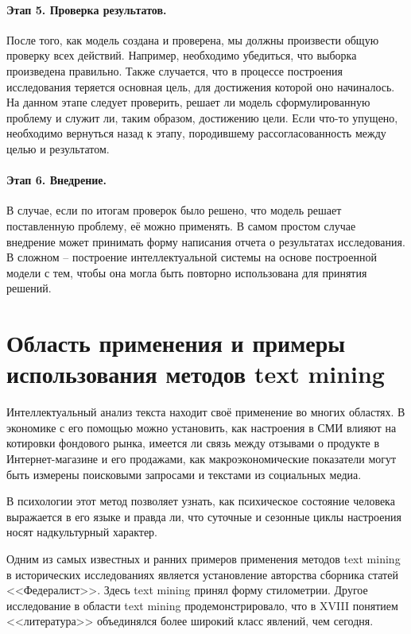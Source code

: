 \paragraph{Этап 5. Проверка результатов.} После того, как модель создана и проверена, мы должны произвести общую проверку всех действий. Например, необходимо убедиться, что выборка произведена правильно. Также случается, что в процессе построения исследования теряется основная цель, для достижения которой оно начиналось. На данном этапе следует проверить, решает ли модель сформулированную проблему и служит ли, таким образом, достижению цели. Если что-то упущено, необходимо вернуться назад к этапу, породившему рассогласованность между целью и результатом.

\paragraph{Этап 6. Внедрение.} В случае, если по итогам проверок было решено, что модель решает поставленную проблему, её можно применять. В самом простом случае внедрение может принимать форму написания отчета о результатах исследования. В сложном -- построение интеллектуальной системы на основе построенной модели с тем, чтобы она могла быть повторно использована для принятия решений.

\section{Область применения и примеры использования методов text mining} \label{sect1_4}

Интеллектуальный анализ текста находит своё применение во многих областях. В экономике с его помощью можно установить, как настроения в СМИ влияют на котировки фондового рынка\cite{Tetlock2007}, имеется ли связь между отзывами о продукте в Интернет-магазине и его продажами\cite{mining_consumer_reviews}, как макроэкономические показатели могут быть измерены поисковыми запросами\cite{Google_econometrics} и текстами из социальных медиа.

В психологии этот метод позволяет узнать, как психическое состояние человека выражается в его языке\cite{psychological_meaning} и правда ли, что суточные и сезонные циклы настроения носят надкультурный характер\cite{seasonal_mood}.

Одним из самых известных и ранних примеров применения методов text mining в исторических исследованиях является установление авторства сборника статей <<Федералист>>\cite{federalist}. Здесь text mining принял форму стилометрии. Другое исследование в области text mining продемонстрировало, что в XVIII понятием <<литература>> объединялся более широкий класс явлений, чем сегодня\cite{encyclopedie}. 


